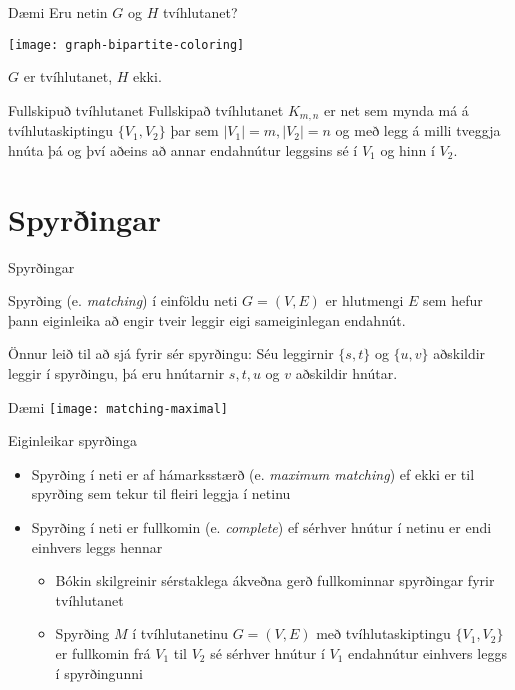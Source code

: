 \documentclass[handout]{beamer}
\begin{document}
\begin{frame}{Dæmi}
Eru netin $G$ og $H$ tvíhlutanet?

\begin{center}
\texttt{[image: graph-bipartite-coloring]}
\end{center}
\pause

$G$ er tvíhlutanet, $H$ ekki.
\end{frame}

\begin{frame}{Fullskipuð tvíhlutanet}
Fullskipað tvíhlutanet $K_{m, n}$ er net sem mynda má á tvíhlutaskiptingu $\{V_1, V_2\}$ þar sem $|V_1| =m, |V_2|=n$ og með legg á milli tveggja hnúta þá og því aðeins að annar endahnútur leggsins sé í $V_1$ og hinn í $V_2$.
\end{frame}

\section{Spyrðingar}

\begin{frame}{Spyrðingar}
\begin{tcolorbox}[title=Spyrðing]
Spyrðing (e. \emph{matching}) í einföldu neti $G = (V, E)$ er hlutmengi $E$ sem hefur þann eiginleika að engir tveir leggir eigi sameiginlegan endahnút.
\end{tcolorbox}
Önnur leið til að sjá fyrir sér spyrðingu: Séu leggirnir $\{s, t\}$ og $\{u, v\}$ aðskildir leggir í spyrðingu, þá eru hnútarnir $s, t, u$ og $v$ aðskildir hnútar.
\end{frame}

\begin{frame}{Dæmi}
\texttt{[image: matching-maximal]}
\end{frame}

\begin{frame}{Eiginleikar spyrðinga}
\begin{itemize}
 \item Spyrðing í neti er af hámarksstærð (e. \emph{maximum matching}) ef ekki er til spyrðing sem tekur til fleiri leggja í netinu
 \item Spyrðing í neti er fullkomin (e. \emph{complete}) ef sérhver hnútur í netinu er endi einhvers leggs hennar
 \begin{itemize}
  \item Bókin skilgreinir sérstaklega ákveðna gerð fullkominnar spyrðingar fyrir tvíhlutanet
  \item Spyrðing $M$ í tvíhlutanetinu $G=(V, E)$ með tvíhlutaskiptingu $\{V_1, V_2\}$ er fullkomin frá $V_1$ til $V_2$ sé sérhver hnútur í $V_1$ endahnútur einhvers leggs í spyrðingunni 
 \end{itemize}
\end{itemize}
\end{frame}
\end{document}
